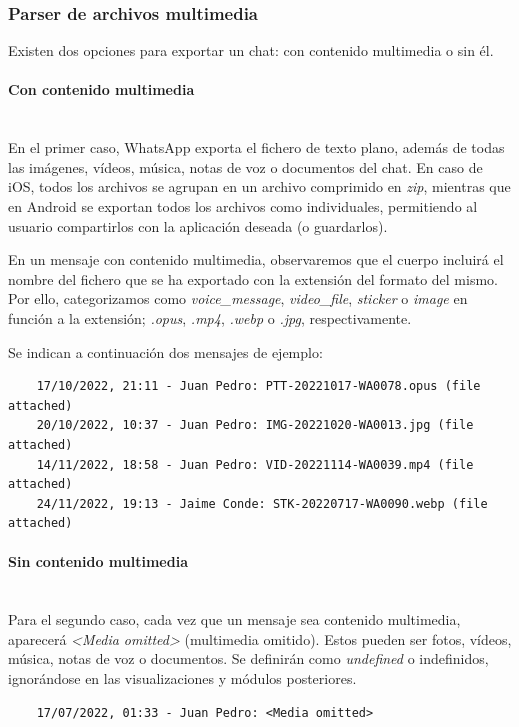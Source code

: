 \subsubsection{Parser de archivos multimedia}

Existen dos opciones para exportar un chat: con contenido multimedia o sin él.

\paragraph{Con contenido multimedia}\mbox{}\\
En el primer caso, WhatsApp exporta el fichero de texto plano, además de todas las imágenes, vídeos, música, notas de voz o documentos del chat. En caso de iOS, todos los archivos se agrupan en un archivo comprimido en \textit{zip}, mientras que en Android se exportan todos los archivos como individuales, permitiendo al usuario compartirlos con la aplicación deseada (o guardarlos).

En un mensaje con contenido multimedia, observaremos que el cuerpo incluirá el nombre del fichero que se ha exportado con la extensión del formato del mismo. Por ello, categorizamos como \textit{voice\_message}, \textit{video\_file}, \textit{sticker} o \textit{image} en función a la extensión; \textit{.opus}, \textit{.mp4}, \textit{.webp} o \textit{.jpg}, respectivamente.

Se indican a continuación dos mensajes de ejemplo:

\begin{lstlisting}
	17/10/2022, 21:11 - Juan Pedro: PTT-20221017-WA0078.opus (file attached)
	20/10/2022, 10:37 - Juan Pedro: IMG-20221020-WA0013.jpg (file attached)
	14/11/2022, 18:58 - Juan Pedro: VID-20221114-WA0039.mp4 (file attached)
	24/11/2022, 19:13 - Jaime Conde: STK-20220717-WA0090.webp (file attached)
\end{lstlisting}

\paragraph{Sin contenido multimedia}\mbox{}\\
Para el segundo caso, cada vez que un mensaje sea contenido multimedia, aparecerá \textit{<Media omitted>} (multimedia omitido). Estos pueden ser fotos, vídeos, música, notas de voz o documentos. Se definirán como \textit{undefined} o indefinidos, ignorándose en las visualizaciones y módulos posteriores.

\begin{lstlisting}
	17/07/2022, 01:33 - Juan Pedro: <Media omitted>
\end{lstlisting}

